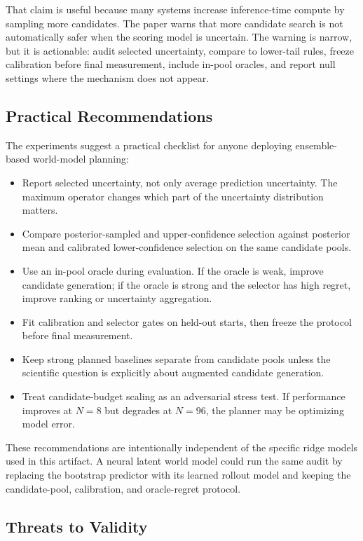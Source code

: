 \documentclass{article}
\begin{document}
That claim is useful because many systems increase inference-time compute by
sampling more candidates. The paper warns that more candidate search is not
automatically safer when the scoring model is uncertain. The warning is narrow,
but it is actionable: audit selected uncertainty, compare to lower-tail rules,
freeze calibration before final measurement, include in-pool oracles, and
report null settings where the mechanism does not appear.

\subsection{Practical Recommendations}

The experiments suggest a practical checklist for anyone deploying
ensemble-based world-model planning:
\begin{itemize}
    \item Report selected uncertainty, not only average prediction
    uncertainty. The maximum operator changes which part of the uncertainty
    distribution matters.
    \item Compare posterior-sampled and upper-confidence selection against
    posterior mean and calibrated lower-confidence selection on the same
    candidate pools.
    \item Use an in-pool oracle during evaluation. If the oracle is weak,
    improve candidate generation; if the oracle is strong and the selector has
    high regret, improve ranking or uncertainty aggregation.
    \item Fit calibration and selector gates on held-out starts, then freeze
    the protocol before final measurement.
    \item Keep strong planned baselines separate from candidate pools unless
    the scientific question is explicitly about augmented candidate
    generation.
    \item Treat candidate-budget scaling as an adversarial stress test. If
    performance improves at $N=8$ but degrades at $N=96$, the planner may be
    optimizing model error.
\end{itemize}

These recommendations are intentionally independent of the specific ridge
models used in this artifact. A neural latent world model could run the same
audit by replacing the bootstrap predictor with its learned rollout model and
keeping the candidate-pool, calibration, and oracle-regret protocol.

\subsection{Threats to Validity}
\end{document}
